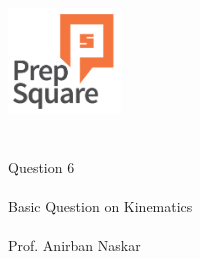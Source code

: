 \documentclass{beamer}
\begin{document}
\begin{center}
\ \\ \ \\
\includegraphics[width=30mm]{Logo-final.png} \\
\ \\ \ \\ 
{\huge Question 6 \\ \ \\ }
{\Large
Basic Question on Kinematics
}
{\large \ \\ \ \\ Prof. Anirban Naskar }
\end{center}
\end{document}
